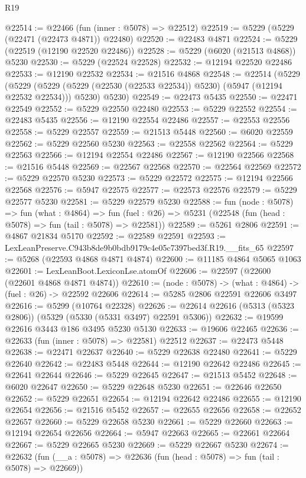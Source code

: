\begin{lexlean}{R19}
\begin{coremodule}
@22514 := @22466 (fun (inner : @5078) => @22512)
@22519 := @5229 (@5229 (@22471 (@22473 @4871)) @22480)
@22520 := @22483 @4871
@22524 := @5229 (@22519 (@12190 @22520 @22486))
@22528 := @5229 (@6020 (@21513 @4868)) @5230
@22530 := @5229 (@22524 @22528)
@22532 := @12194 @22520 @22486
@22533 := @12190 @22532
@22534 := @21516 @4868
@22548 := @22514
    (@5229
      (@5229 (@5229 (@5229 (@22530 (@22533 @22534)) @5230) (@5947 (@12194 @22532 @22534))) @5230)
      @5230)
@22549 := @22473 @5435
@22550 := @22471 @22549
@22552 := @5229 @22550 @22480
@22553 := @5229 @22552
@22554 := @22483 @5435
@22556 := @12190 @22554 @22486
@22557 := @22553 @22556
@22558 := @5229 @22557
@22559 := @21513 @5448
@22560 := @6020 @22559
@22562 := @5229 @22560 @5230
@22563 := @22558 @22562
@22564 := @5229 @22563
@22566 := @12194 @22554 @22486
@22567 := @12190 @22566
@22568 := @21516 @5448
@22569 := @22567 @22568
@22570 := @22564 @22569
@22572 := @5229 @22570 @5230
@22573 := @5229 @22572
@22575 := @12194 @22566 @22568
@22576 := @5947 @22575
@22577 := @22573 @22576
@22579 := @5229 @22577 @5230
@22581 := @5229 @22579 @5230
@22588 := fun (node : @5078) =>
  fun (what : @4864) =>
  fun (fuel : @26) => @5231 (@22548 (fun (head : @5078) => fun (tail : @5078) => @22581))
@22589 := @5261 @2806
@22591 := @4867 @21834 @5170
@22592 := @22589 @22591
@22593 := LexLeanPreserve.C943b8de9b0bdb9179c4e05c7397bed3f.R19.__fits_65
@22597 := @5268 (@22593 @4868 @4871 @4874)
@22600 := @11185 @4864 @5065 @1063
@22601 := LexLeanBoot.LexiconLse.atomOf
@22606 := @22597 (@22600 (@22601 @4868 @4871 @4874))
@22610 := (node : @5078) -> (what : @4864) -> (fuel : @26) -> @22592 @22606
@22614 := @5285 @2806 @22591 @22606 @3497
@22616 := @5299 (@10764 @22328)
@22626 := @22614 @22616 (@5313 (@5323 @2806)) (@5329 (@5330 (@5331 @3497) @22591 @5306))
@22632 := @19599 @22616 @3443 @186 @3495 @5230 @5130
@22633 := @19606 @22465
@22636 := @22633 (fun (inner : @5078) => @22581) @22512
@22637 := @22473 @5448
@22638 := @22471 @22637
@22640 := @5229 @22638 @22480
@22641 := @5229 @22640
@22642 := @22483 @5448
@22644 := @12190 @22642 @22486
@22645 := @22641 @22644
@22646 := @5229 @22645
@22647 := @21513 @5452
@22648 := @6020 @22647
@22650 := @5229 @22648 @5230
@22651 := @22646 @22650
@22652 := @5229 @22651
@22654 := @12194 @22642 @22486
@22655 := @12190 @22654
@22656 := @21516 @5452
@22657 := @22655 @22656
@22658 := @22652 @22657
@22660 := @5229 @22658 @5230
@22661 := @5229 @22660
@22663 := @12194 @22654 @22656
@22664 := @5947 @22663
@22665 := @22661 @22664
@22667 := @5229 @22665 @5230
@22669 := @5229 @22667 @5230
@22674 := @22632 (fun (__a : @5078) => @22636 (fun (head : @5078) => fun (tail : @5078) => @22669))

\end{coremodule}
\end{lexlean}
